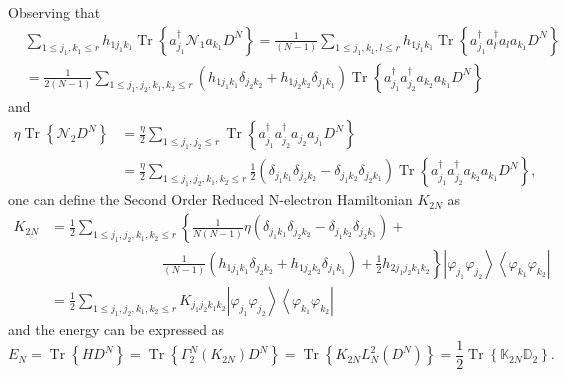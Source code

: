 \documentclass[aps,preprint]{revtex4}%
\begin{document}
Observing that%
\begin{align}
&  \sum_{1\leq j_{1},k_{1}\leq r}h_{1j_{1}k_{1}}\operatorname{Tr}\left\{
a_{j_{1}}^{\dagger}\mathcal{N}_{1}a_{k_{1}}D^{N}\right\}  =\frac{1}{\left(
N-1\right)  }\sum_{1\leq j_{1},k_{1},l\leq r}h_{1j_{1}k_{1}}\operatorname{Tr}%
\left\{  a_{j_{1}}^{\dagger}a_{l}^{\dagger}a_{l}a_{k_{1}}D^{N}\right\}
\nonumber\\
&  =\frac{1}{2\left(  N-1\right)  }\sum_{1\leq j_{1},j_{2},k_{1},k_{2}\leq
r}\left(  h_{1j_{1}k_{1}}\delta_{j_{2}k_{2}}+h_{1j_{2}k_{2}}\delta_{j_{1}%
k_{1}}\right)  \operatorname{Tr}\left\{  a_{j_{1}}^{\dagger}a_{j_{2}}%
^{\dagger}a_{k_{2}}a_{k_{1}}D^{N}\right\}
\end{align}
and
\begin{align}
\eta\operatorname{Tr}\left\{  \mathcal{N}_{2}D^{N}\right\}   &  =\frac{\eta
}{2}\sum_{1\leq j_{1},j_{2}\leq r}\operatorname{Tr}\left\{  a_{j_{1}}%
^{\dagger}a_{j_{2}}^{\dagger}a_{j_{2}}a_{j_{1}}D^{N}\right\} \nonumber\\
&  =\frac{\eta}{2}\sum_{1\leq j_{1},j_{2},k_{1},k_{2}\leq r}\frac{1}{2}\left(
\delta_{j_{1}k_{1}}\delta_{j_{2}k_{2}}-\delta_{j_{1}k_{2}}\delta_{j_{2}k_{1}%
}\right)  \operatorname{Tr}\left\{  a_{j_{1}}^{\dagger}a_{j_{2}}^{\dagger
}a_{k_{2}}a_{k_{1}}D^{N}\right\}  ,
\end{align}
one can define the Second Order Reduced N-electron Hamiltonian $K_{2N}$ as
\begin{align}
K_{2N}  &  =\frac{1}{2}\sum_{1\leq j_{1},j_{2},k_{1},k_{2}\leq r}\left\{
\frac{1}{N\left(  N-1\right)  }\eta\left(  \delta_{j_{1}k_{1}}\delta
_{j_{2}k_{2}}-\delta_{j_{1}k_{2}}\delta_{j_{2}k_{1}}\right)  \right.
+\nonumber\\
&  \qquad\qquad\qquad\qquad\left.  \frac{1}{\left(  N-1\right)  }\left(
h_{1j_{1}k_{1}}\delta_{j_{2}k_{2}}+h_{1j_{2}k_{2}}\delta_{j_{1}k_{1}}\right)
+\frac{1}{2}h_{2j_{1}j_{2}k_{1}k_{2}}\right\}  \left\vert \varphi_{j_{1}%
}\varphi_{j_{2}}\right\rangle \left\langle \varphi_{k_{1}}\varphi_{k_{2}%
}\right\vert \nonumber\\
&  =\frac{1}{2}\sum_{1\leq j_{1},j_{2},k_{1},k_{2}\leq r}K_{j_{1}j_{2}%
k_{1}k_{2}}\left\vert \varphi_{j_{1}}\varphi_{j_{2}}\right\rangle \left\langle
\varphi_{k_{1}}\varphi_{k_{2}}\right\vert
\end{align}
and the energy can be expressed as
\begin{equation}
E_{N}=\operatorname{Tr}\left\{  HD^{N}\right\}  =\operatorname{Tr}\left\{
\Gamma_{2}^{N}\left(  K_{2N}\right)  D^{N}\right\}  =\operatorname{Tr}\left\{
K_{2N}L_{N}^{2}\left(  D^{N}\right)  \right\}  =\frac{1}{2}\operatorname{Tr}%
\left\{  \mathbb{K}_{2N}\mathbb{D}_{2}\right\}  .
\end{equation}
\end{document}
